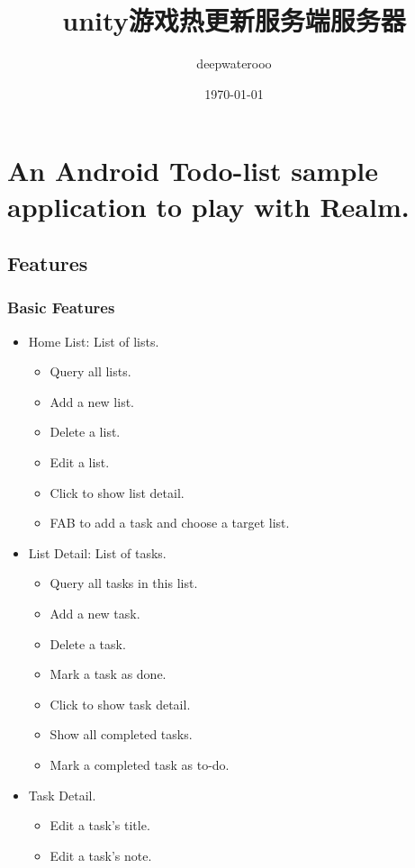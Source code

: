 \documentclass[9pt, b5paper]{article}
\author{deepwaterooo}
\date{\today}
\title{unity游戏热更新服务端服务器}
\begin{document}
\maketitle
\tableofcontents


\section{An Android Todo-list sample application to play with Realm.}
\label{sec-1}

\subsection{Features}
\label{sec-1-1}
\subsubsection{Basic Features}
\label{sec-1-1-1}
\begin{itemize}
\item Home List: List of lists.
\begin{itemize}
\item Query all lists.
\item Add a new list.
\item Delete a list.
\item Edit a list.
\item Click to show list detail.
\item FAB to add a task and choose a target list.
\end{itemize}
\item List Detail: List of tasks.
\begin{itemize}
\item Query all tasks in this list.
\item Add a new task.
\item Delete a task.
\item Mark a task as done.
\item Click to show task detail.
\item Show all completed tasks.
\item Mark a completed task as to-do.
\end{itemize}
\item Task Detail.
\begin{itemize}
\item Edit a task's title.
\item Edit a task's note.
\end{itemize}
\end{itemize}
\end{document}
